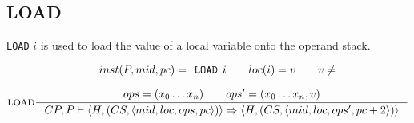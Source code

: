 \subsection{LOAD}
\texttt{LOAD} $i$ is used to load the value of a local variable onto the operand stack.

$$\inference[LOAD]{
inst(P, mid, pc) = \texttt{LOAD } i \semsp 
loc(i) = v \semsp
v \neq \perp \semnl \\
ops = (x_0 \ldots x_n) \semsp
ops' = (x_0 \ldots x_n,v)  
}
{CP, P \vdash \langle H, (CS, \langle mid, loc, ops, pc \rangle)\rangle \Rightarrow 
 \langle H, (CS, \langle mid, loc, ops', pc + 2 \rangle)\rangle 
}$$

